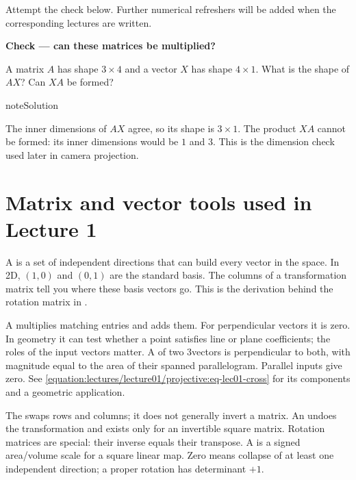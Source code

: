 \documentclass[letterpaper,11pt,english,openany,oneside]{jupyterBook}
\begin{document}
\sphinxAtStartPar
Attempt the check below. Further numerical refreshers will be added when the corresponding lectures are written.

\begin{TextbookBox}
\textbf{Check — can these matrices be multiplied?}\par\smallskip

\sphinxAtStartPar
A matrix \(A\) has shape \(3\times4\) and a vector \(X\) has shape \(4\times1\). What is the shape of \(AX\)? Can \(XA\) be formed?

\end{TextbookBox}

\begin{sphinxadmonition}{note}{Solution}

\sphinxAtStartPar
The inner dimensions of \(AX\) agree, so its shape is \(3\times1\). The product \(XA\) cannot be formed: its inner dimensions would be \(1\) and \(3\). This is the dimension check used later in camera projection.
\end{sphinxadmonition}


\section{Matrix and vector tools used in Lecture 1}
\label{\detokenize{foundations/prerequisites:matrix-and-vector-tools-used-in-lecture-1}}
\sphinxAtStartPar
A  is a set of independent directions that can build every vector in the space. In 2D, \((1,0)\) and \((0,1)\) are the standard basis. The columns of a transformation matrix tell you where these basis vectors go. This is the derivation behind the rotation matrix in {\hyperref[\detokenize{lectures/lecture01/transformations:lec01-transformations}]{}}.

\sphinxAtStartPar
A  multiplies matching entries and adds them. For perpendicular vectors it is zero. In geometry it can test whether a point satisfies line or plane coefficients; the roles of the input vectors matter. A  of two 3\sphinxhyphen{}vectors is perpendicular to both, with magnitude equal to the area of their spanned parallelogram. Parallel inputs give zero. See \eqref{equation:lectures/lecture01/projective:eq-lec01-cross} for its components and a geometric application.

\sphinxAtStartPar
The  swaps rows and columns; it does not generally invert a matrix. An  undoes the transformation and exists only for an invertible square matrix. Rotation matrices are special: their inverse equals their transpose. A  is a signed area/volume scale for a square linear map. Zero means collapse of at least one independent direction; a proper rotation has determinant \(+1\).
\end{document}
